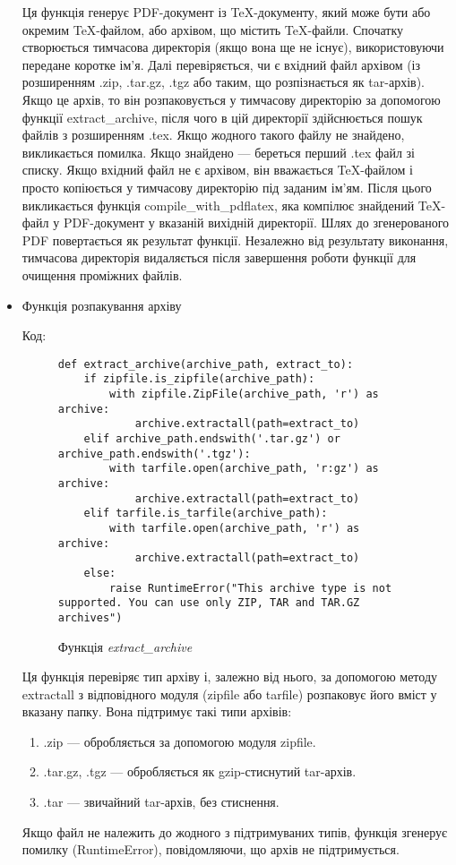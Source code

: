 \documentclass[a4paper,14pt]{extarticle}
\numberwithin{figure}{section}
\begin{document}
\begin{itemize}
     Ця функція генерує PDF-документ із TeX-документу, який може бути або окремим TeX-файлом, або архівом, що містить TeX-файли. Спочатку створюється тимчасова директорія (якщо вона ще не існує), використовуючи передане коротке ім’я. Далі перевіряється, чи є вхідний файл архівом (із розширенням .zip, .tar.gz, .tgz або таким, що розпізнається як tar-архів). Якщо це архів, то він розпаковується у тимчасову директорію за допомогою функції extract\_archive, після чого в цій директорії здійснюється пошук файлів з розширенням .tex. Якщо жодного такого файлу не знайдено, викликається помилка. Якщо знайдено — береться перший .tex файл зі списку. Якщо вхідний файл не є архівом, він вважається TeX-файлом і просто копіюється у тимчасову директорію під заданим ім’ям. Після цього викликається функція compile\_with\_pdflatex, яка компілює знайдений TeX-файл у PDF-документ у вказаній вихідній директорії. Шлях до згенерованого PDF повертається як результат функції. Незалежно від результату виконання, тимчасова директорія видаляється після завершення роботи функції для очищення проміжних файлів.

    \newpage
    \item Функція розпакування архіву

    Код:
    \begin{figure}[h]
    \centering
    \begin{lstlisting}[style=mystyle]
    def extract_archive(archive_path, extract_to):
    if zipfile.is_zipfile(archive_path):
        with zipfile.ZipFile(archive_path, 'r') as archive:
            archive.extractall(path=extract_to)
    elif archive_path.endswith('.tar.gz') or archive_path.endswith('.tgz'):
        with tarfile.open(archive_path, 'r:gz') as archive:
            archive.extractall(path=extract_to)
    elif tarfile.is_tarfile(archive_path):
        with tarfile.open(archive_path, 'r') as archive:
            archive.extractall(path=extract_to)
    else:
        raise RuntimeError("This archive type is not supported. You can use only ZIP, TAR and TAR.GZ archives")
    \end{lstlisting}
    \caption{\normalsize Функція \textit{extract\_archive}}
    \end{figure}

    Ця функція перевіряє тип архіву і, залежно від нього, за допомогою методу extractall з відповідного модуля (zipfile або tarfile) розпаковує його вміст у вказану папку. Вона підтримує такі типи архівів:
    \begin{enumerate}[label=\arabic*)]
        \item .zip — обробляється за допомогою модуля zipfile.
        \item .tar.gz, .tgz — обробляється як gzip-стиснутий tar-архів.
        \item .tar — звичайний tar-архів, без стиснення.
    \end{enumerate}
    Якщо файл не належить до жодного з підтримуваних типів, функція згенерує помилку (RuntimeError), повідомляючи, що архів не підтримується.


\end{itemize}
\end{document}
